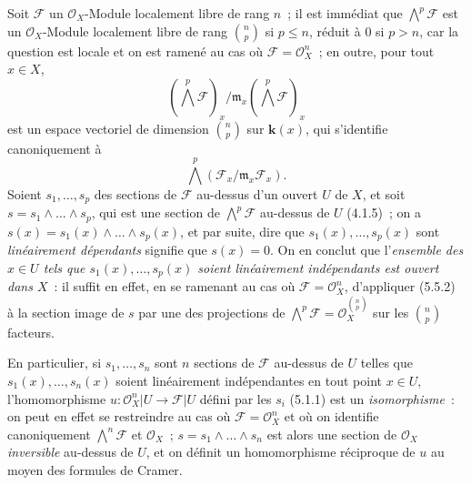 \begin{env}[5.5.4]
\label{0.5.5.4-fr}
Soit $\mathcal{F}$ un $\mathcal{O}_X$-Module localement libre de rang $n$~;
il est immédiat que $\bigwedge^p\mathcal{F}$ est un $\mathcal{O}_X$-Module
localement libre de rang $\binom{n}{p}$ si $p\leq n$, réduit à $0$ si $p>n$,
car la question est locale et on est ramené au cas où
$\mathcal{F}=\mathcal{O}_X^n$~; en outre, pour tout $x\in X$,
\[
  (\bigwedge^p\mathcal{F})_x/
  \mathfrak{m}_x(\bigwedge^p\mathcal{F})_x
\]
est un espace vectoriel de dimension $\binom{n}{p}$ sur $\boldsymbol{k}(x)$, qui
s'identifie canoniquement à
\[
  \bigwedge^p(\mathcal{F}_x/\mathfrak{m}_x\mathcal{F}_x).
\]
Soient
$s_1,\ldots,s_p$ des sections de $\mathcal{F}$ au-dessus d'un ouvert $U$ de $X$, et
soit $s=s_1\wedge\ldots\wedge s_p$, qui est une section de
$\bigwedge^p\mathcal{F}$ au-dessus de $U$ (4.1.5)~; on a
$s(x)=s_1(x)\wedge\ldots\wedge s_p(x)$, et par suite, dire que
$s_1(x),\ldots,s_p(x)$ sont \emph{linéairement dépendants} signifie que
$s(x)=0$. On en conclut que l'\emph{ensemble des $x\in U$ tels que
$s_1(x),\ldots,s_p(x)$ soient linéairement indépendants est ouvert dans
$X$}~: il suffit en effet, en se ramenant au cas où
$\mathcal{F}=\mathcal{O}_X^n$, d'appliquer (5.5.2) à la section image de $s$
par une des projections de
$\bigwedge^p\mathcal{F}=\mathcal{O}_X^{\binom{n}{p}}$ sur les
$\binom{n}{p}$ facteurs.

En particulier, si $s_1,\ldots,s_n$ sont $n$ sections de $\mathcal{F}$
au-dessus de $U$ telles que $s_1(x),\ldots,s_n(x)$ soient linéairement
indépendantes en tout point $x\in U$, l'homomorphisme
$u:\mathcal{O}_X^n|U\to\mathcal{F}|U$ défini par les $s_i$ (5.1.1) est un
\emph{isomorphisme}~: on peut en effet se restreindre au cas où
$\mathcal{F}=\mathcal{O}_X^n$ et où on identifie canoniquement
$\bigwedge^n\mathcal{F}$ et $\mathcal{O}_X$~;
$s=s_1\wedge\ldots\wedge s_n$ est alors une section de $\mathcal{O}_X$
\emph{inversible} au-dessus de $U$, et on définit un homomorphisme réciproque
de $u$ au moyen des formules de Cramer.
\end{env}

